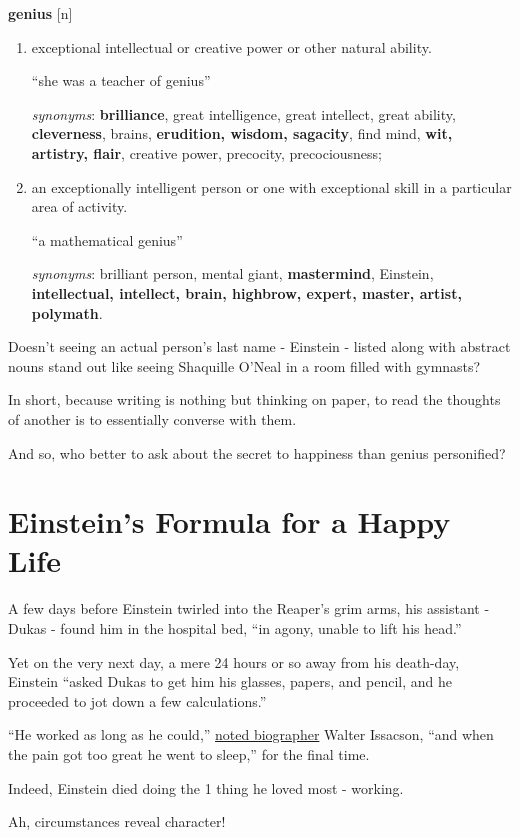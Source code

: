 \documentclass{book}
\numberwithin{equation}{section}
\begin{document}
\textbf{genius} [n]
\begin{enumerate}
    \item exceptional intellectual or creative power or other natural ability.
    
    ``she was a teacher of genius''
    
    \textit{synonyms}: \textbf{brilliance}, great intelligence, great intellect, great ability, \textbf{cleverness}, brains, \textbf{erudition, wisdom, sagacity}, find mind, \textbf{wit, artistry, flair}, creative power, precocity, precociousness;
    \item an exceptionally intelligent person or one with exceptional skill in a particular area of activity.
    
    ``a mathematical genius''
    
    \textit{synonyms}: brilliant person, mental giant, \textbf{mastermind}, Einstein, \textbf{intellectual, intellect, brain, highbrow, expert, master, artist, polymath}. 
\end{enumerate}
Doesn't seeing an actual person's last name - Einstein - listed along with abstract nouns stand out like seeing Shaquille O'Neal in a room filled with gymnasts?

%
In short, because writing is nothing but thinking on paper, to read the thoughts of another is to essentially converse with them.

And so, who better to ask about the secret to happiness than genius personified?

\section{Einstein's Formula for a Happy Life}
A few days before Einstein twirled into the Reaper's grim arms, his assistant - Dukas - found him in the hospital bed, ``in agony, unable to lift his head.''

%
Yet on the very next day, a mere 24 hours or so away from his death-day, Einstein ``asked Dukas to get him his glasses, papers, and pencil, and he proceeded to jot down a few calculations.''

%
``He worked as long as he could,'' \href{https://workbooks.colombo.ca/issue-37-15-april-2020/}{noted biographer} Walter Issacson, ``and when the pain got too great he went to sleep,'' for the final time.

Indeed, Einstein died doing the 1 thing he loved most - working.

Ah, circumstances reveal character!
\end{document}
